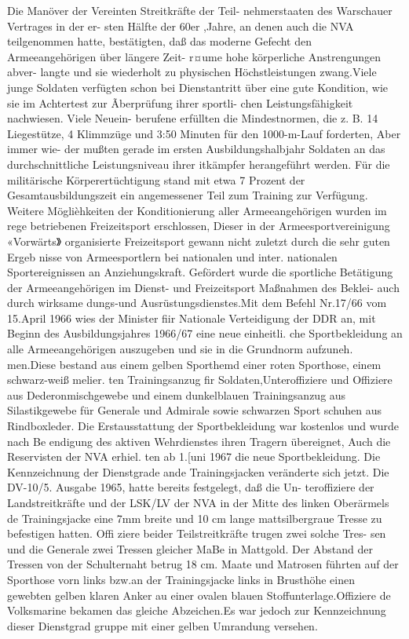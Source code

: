 

Die Manöver der Vereinten Streitkräfte der Teil-
nehmerstaaten des Warschauer Vertrages in der er-
sten Hälfte der 60er ,Jahre, an denen auch die NVA
teilgenommen hatte, bestätigten, daß das moderne
Gefecht den Armeeangehörigen über längere Zeit-
r¤ume hohe körperliche Anstrengungen abver-
langte und sie wiederholt zu physischen Höchstleistungen zwang.Viele junge Soldaten verfügten
schon bei Dienstantritt über eine gute Kondition,
wie sie im Achtertest zur Ãberprüfung ihrer sportli-
chen Leistungsfähigkeit nachwiesen. Viele Neuein-
berufene erfüllten die Mindestnormen, die z. B.
14 Liegestütze, 4 Klimmzüge und 3:50 Minuten
für den 1000-m-Lauf forderten, Aber immer wie-
der mußten gerade im ersten Ausbildungshalbjahr
Soldaten an das durchschnittliche Leistungsniveau
ihrer itkämpfer herangeführt werden.
Für die militärische Körperertüchtigung stand
mit etwa 7 Prozent der Gesamtausbildungszeit ein
angemessener Teil zum Training zur Verfügung.
Weitere Möglièhkeiten der Konditionierung aller
Armeeangehörigen wurden im rege betriebenen
Freizeitsport erschlossen, Dieser in der Armeesportvereinigung «Vorwärts》 organisierte Freizeitsport
gewann nicht zuletzt durch die sehr guten Ergeb
nisse von Armeesportlern bei nationalen und inter.
nationalen Sportereignissen an Anziehungskraft.
Gefördert wurde die sportliche Betätigung der
Armeeangehörigen im Dienst- und Freizeitsport
Maßnahmen des Beklei-
auch durch wirksame
dungs-und Ausrüstungsdienstes.Mit dem Befehl
Nr.17/66 vom 15.April 1966 wies der Minister fiir
Nationale Verteidigung der DDR an, mit Beginn
des Ausbildungsjahres 1966/67 eine neue einheitli.
che Sportbekleidung an alle Armeeangehörigen
auszugeben und sie in die Grundnorm aufzuneh.
men.Diese bestand aus einem gelben Sporthemd
einer roten Sporthose, einem schwarz-weiß melier.
ten Trainingsanzug fir Soldaten,Unteroffiziere
und Offiziere aus Dederonmischgewebe und einem
dunkelblauen Trainingsanzug aus Silastikgewebe
für Generale und Admirale sowie schwarzen Sport
schuhen aus Rindboxleder. Die Erstausstattung der
Sportbekleidung war kostenlos und wurde nach Be
endigung des aktiven Wehrdienstes ihren Tragern
übereignet, Auch die Reservisten der NVA erhiel.
ten ab 1.[uni 1967 die neue Sportbekleidung.
Die Kennzeichnung der Dienstgrade ande
Trainingsjacken veränderte sich jetzt. Die DV-10/5.
Ausgabe 1965, hatte bereits festgelegt, daß die Un-
teroffiziere der Landstreitkräfte und der LSK/LV
der NVA in der Mitte des linken Oberärmels de
Trainingsjacke eine 7mm breite und 10 cm lange
mattsilbergraue Tresse zu befestigen hatten. Offi
ziere beider Teilstreitkräfte trugen zwei solche Tres-
sen und die Generale zwei Tressen gleicher MaBe
in Mattgold. Der Abstand der Tressen von der
Schulternaht betrug 18 cm.
Maate und Matrosen führten auf der Sporthose
vorn links bzw.an der Trainingsjacke links in
Brusthöhe einen gewebten gelben klaren Anker au
einer ovalen blauen Stoffunterlage.Offiziere de
Volksmarine bekamen das gleiche Abzeichen.Es
war jedoch zur Kennzeichnung dieser Dienstgrad
gruppe mit einer gelben Umrandung versehen.